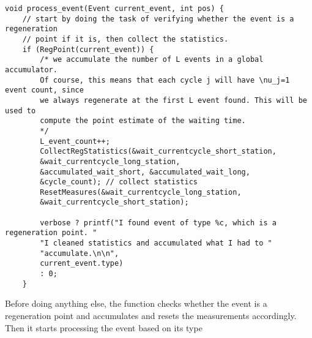 \documentclass[12pt]{article}
\begin{document}
\begin{lstlisting}
void process_event(Event current_event, int pos) {
	// start by doing the task of verifying whether the event is a regeneration
	// point if it is, then collect the statistics.
	if (RegPoint(current_event)) {
		/* we accumulate the number of L events in a global accumulator.
		Of course, this means that each cycle j will have \nu_j=1 event count, since
		we always regenerate at the first L event found. This will be used to
		compute the point estimate of the waiting time.
		*/
		L_event_count++;
		CollectRegStatistics(&wait_currentcycle_short_station,
		&wait_currentcycle_long_station,
		&accumulated_wait_short, &accumulated_wait_long,
		&cycle_count); // collect statistics
		ResetMeasures(&wait_currentcycle_long_station,
		&wait_currentcycle_short_station);
		
		verbose ? printf("I found event of type %c, which is a regeneration point. "
		"I cleaned statistics and accumulated what I had to "
		"accumulate.\n\n",
		current_event.type)
		: 0;
	}
\end{lstlisting}
	Before doing anything else, the function checks whether the event is a regeneration point and accumulates and resets the measurements accordingly. Then it starts processing the event based on its type
\end{document}
